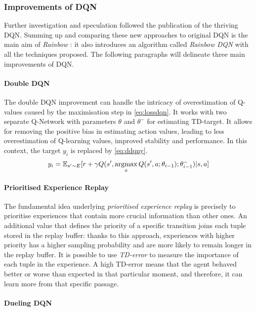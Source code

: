 \subsubsection{Improvements of DQN}
Further investigation and speculation followed the publication of the thriving DQN. Summing up and comparing these new approaches to original DQN is the main aim of \textit{Rainbow} \cite{hessel2018rainbow}: it also introduces an algorithm called \textit{Rainbow DQN} with all the techniques proposed. The following paragraphs will delineate three main improvements of DQN.

\paragraph{Double DQN}
The double DQN \cite{hasselt2010double, van2016deep} improvement can handle the intricacy of overestimation of Q-values caused by the maximisation step in \vref{eq:lossdqn}. It works with two separate Q-Network with parameters $\theta$ and $\theta^-$ for estimating TD-target. It allows for removing the positive bias in estimating action values, leading to less overestimation of Q-learning values, improved stability and performance. In this context, the target $y_i$ is replaced by \vref{eq:ddqny}.
\begin{equation} \label{eq:ddqny}
	y_i = \mathbb{E}_{s' \sim E}[r + \gamma Q(s',\operatornamewithlimits{argmax}_aQ(s', a; \theta_{i-1}); \theta^-_{i-1})|s,a]
\end{equation}
\paragraph{Prioritised Experience Replay}

The fundamental idea underlying \textit{prioritised experience replay} \cite{schaul2015prioritized} is precisely to prioritise experiences that contain more crucial information than other ones. An additional value that defines the priority of a specific transition joins each tuple stored in the replay buffer: thanks to this approach, experiences with higher priority has a higher sampling probability and are more likely to remain longer in the replay buffer. It is possible to use \textit{TD-error} to measure the importance of each tuple in the experience. A high TD-error means that the agent behaved better or worse than expected in that particular moment, and therefore, it can learn more from that specific passage.

\paragraph{Dueling DQN}

